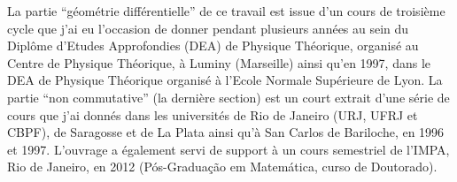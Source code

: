 La partie ``g\'eom\'etrie diff\'erentielle''  de ce travail est issue d'un
cours de troisi\`eme cycle que j'ai eu l'occasion de donner pendant plusieurs
ann\'ees au sein du Dipl\^ome d'Etudes Approfondies (DEA) de Physique
Th\'eorique, organis\'e au Centre de Physique Th\'eorique, \`a Luminy (Marseille) ainsi qu'en 1997, dans le DEA de Physique Th\'eorique organis\'e \`a 
l'Ecole Normale Sup\'erieure de Lyon. La partie ``non commutative'' (la derni\`ere section) est un court extrait d'une s\'erie de cours que j'ai  donn\'es dans les universit\'es de Rio de Janeiro (URJ, UFRJ et CBPF), de Saragosse et de La Plata ainsi qu'\`a San Carlos de  Bariloche, en 1996 et 1997. L'ouvrage a \'egalement servi de support \`a un cours semestriel de l'IMPA, Rio de Janeiro, en 2012 (P\'os-Gradua\c c\~ao em Matem\'atica, curso de Doutorado).


